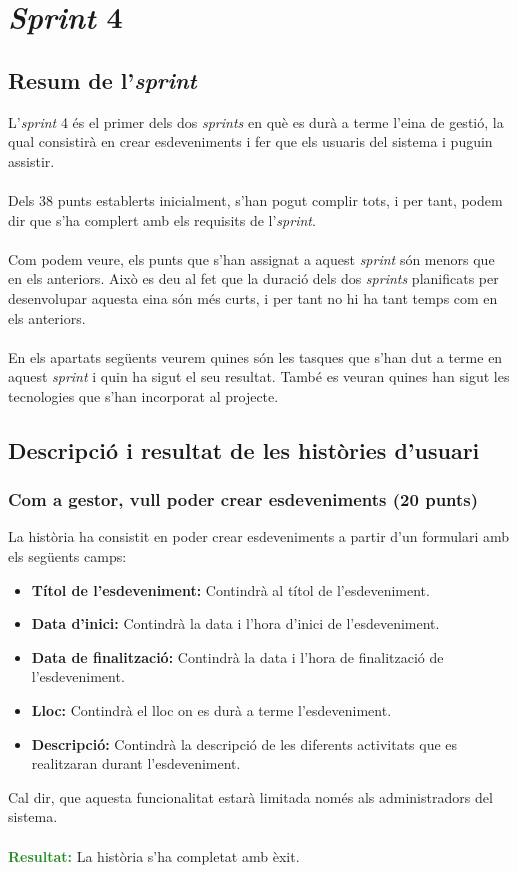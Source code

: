 \documentclass[11pt,catalan,listoffigures,listoftables]{tfgetsinf}
\begin{document}
\section{\textit{Sprint} 4}

\subsection{Resum de l'\textit{sprint}}

L'\textit{sprint} 4 és el primer dels dos \textit{sprints} en què es durà a terme l'eina de gestió, la qual consistirà en crear esdeveniments i fer que els usuaris del sistema i puguin assistir.\\ \\
Dels 38 punts establerts inicialment, s'han pogut complir tots, i per tant, podem dir que s'ha complert amb els requisits de l'\textit{sprint}.\\ \\
Com podem veure, els punts que s'han assignat a aquest \textit{sprint} són menors que en els anteriors. Això es deu al fet que la duració dels dos \textit{sprints} planificats per desenvolupar aquesta eina són més curts, i per tant no hi ha tant temps com en els anteriors.\\ \\
En els apartats següents veurem quines són les tasques que s'han dut a terme en aquest \textit{sprint} i quin ha sigut el seu resultat. També es veuran quines han sigut les tecnologies que s'han incorporat al projecte.

\subsection{Descripció i resultat de les històries d'usuari}

\subsubsection{Com a gestor, vull poder crear esdeveniments (20 punts)}

La història ha consistit en poder crear esdeveniments a partir d'un formulari amb els següents camps:
\begin{itemize}
\item \textbf{Títol de l'esdeveniment:} Contindrà al títol de l'esdeveniment.
\item \textbf{Data d'inici:} Contindrà la data i l'hora d'inici de l'esdeveniment.
\item \textbf{Data de finalització:} Contindrà la data i l'hora de finalització de l'esdeveniment.
\item \textbf{Lloc:} Contindrà el lloc on es durà a terme l'esdeveniment.
\item \textbf{Descripció:} Contindrà la descripció de les diferents activitats que es realitzaran durant l'esdeveniment.
\end{itemize}
Cal dir, que aquesta funcionalitat estarà limitada només als administradors del sistema.\\ \\
\textcolor{forestgreen}{\textbf{Resultat:}} La història s'ha completat amb èxit.
\end{document}

